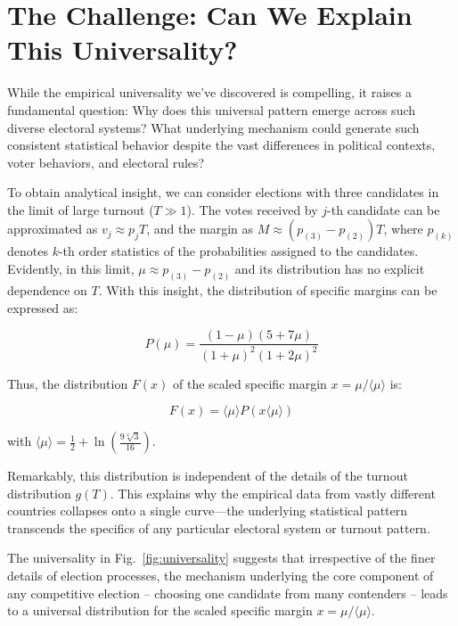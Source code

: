 \section{The Challenge: Can We Explain This Universality?}

While the empirical universality we've discovered is compelling, it raises a fundamental question: Why does this universal pattern emerge across such diverse electoral systems? What underlying mechanism could generate such consistent statistical behavior despite the vast differences in political contexts, voter behaviors, and electoral rules?

To obtain analytical insight, we can consider elections with three candidates in the limit of large turnout ($T \gg 1$). The votes received by $j$-th candidate can be approximated as $v_j \approx p_jT$, and the margin as $M \approx \left(p_{(3)} - p_{(2)}\right) T$, where $p_{(k)}$ denotes $k$-th order statistics of the probabilities assigned to the candidates. Evidently, in this limit, $\mu \approx p_{(3)} - p_{(2)}$ and its distribution has no explicit dependence on $T$. With this insight, the distribution of specific margins can be expressed as:

\begin{equation}
    P(\mu) = \frac{(1 - \mu)(5 + 7\mu)}{(1 + \mu)^2(1 + 2\mu)^2}
\end{equation}

Thus, the distribution $F(x)$ of the scaled specific margin $x = \mu/\langle\mu\rangle$ is:

\begin{equation}
    F(x) = \langle\mu\rangle P(x\langle\mu\rangle)
\end{equation}

with $\langle\mu\rangle = \frac{1}{2} + \ln\left(\frac{9\sqrt[4]{3}}{16}\right)$.

Remarkably, this distribution is independent of the details of the turnout distribution $g(T)$. This explains why the empirical data from vastly different countries collapses onto a single curve—the underlying statistical pattern transcends the specifics of any particular electoral system or turnout pattern.

The universality in Fig.~\ref{fig:universality} suggests that irrespective of the finer details of election processes, the mechanism underlying the core component of any competitive election -- choosing one candidate from many contenders -- leads to a universal distribution for the scaled specific margin $x=\mu/\langle \mu \rangle$.

